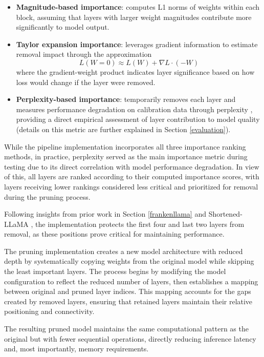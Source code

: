 \begin{itemize}
   \item \textbf{Magnitude-based importance}: computes L1 norms of weights within each block, assuming that layers with larger weight magnitudes contribute more significantly to model output.
   
   \item \textbf{Taylor expansion importance}: leverages gradient information to estimate removal impact through the approximation 
   \begin{equation}
    L(W = 0) \approx L(W) + \nabla L \cdot (-W)
   \end{equation}
   where the gradient-weight product indicates layer significance based on how loss would change if the layer were removed.
   
   \item \textbf{Perplexity-based importance}: temporarily removes each layer and measures performance degradation on calibration data through perplexity \cite{perplexity}, providing a direct empirical assessment of layer contribution to model quality (details on this metric are further explained in Section \ref{evaluation}).
\end{itemize}

While the pipeline implementation incorporates all three importance ranking methods, in practice, perplexity served as the main importance metric during testing due to its direct correlation with model performance degradation. In view of this, all layers are ranked according to their computed importance scores, with layers receiving lower rankings considered less critical and prioritized for removal during the pruning process.

Following insights from prior work in Section \ref{frankenllama} and Shortened-LLaMA \cite{shortened_llama}, the implementation protects the first four and last two layers from removal, as these positions prove critical for maintaining performance.

The pruning implementation creates a new model architecture with reduced depth by systematically copying weights from the original model while skipping the least important layers. The process begins by modifying the model configuration to reflect the reduced number of layers, then establishes a mapping between original and pruned layer indices. This mapping accounts for the gaps created by removed layers, ensuring that retained layers maintain their relative positioning and connectivity.

The resulting pruned model maintains the same computational pattern as the original but with fewer sequential operations, directly reducing inference latency and, most importantly, memory requirements.

